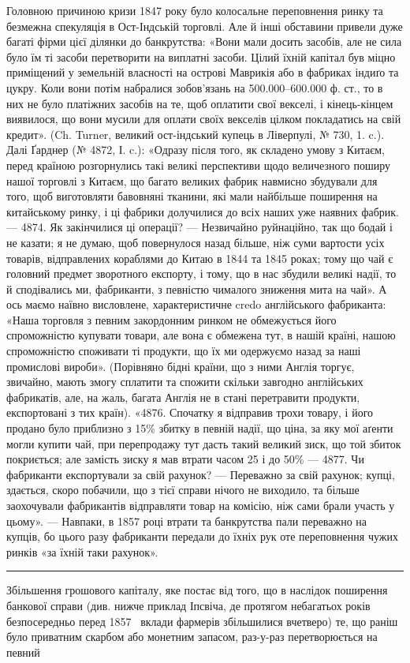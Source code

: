 Головною причиною кризи 1847 року було колосальне переповнення ринку
та безмежна спекуляція в Ост-Індській торговлі. Але й інші обставини привели
дуже багаті фірми цієї ділянки до банкрутства: «Вони мали досить засобів, але не
сила було їм ті засоби перетворити на виплатні засоби. Цілий їхній капітал був міцно
приміщений у земельній власності на острові Маврикія або в фабриках індиґо та
цукру. Коли вони потім набралися зобов’язань на \num{500.000}--\num{600.000} ф. ст., то
в них не було платіжних засобів на те, щоб оплатити свої векселі, і кінець-кінцем
виявилося, що вони мусили для оплати своїх векселів цілком покладатись
на свій кредит». (Ch. Turner, великий ост-індський купець в Ліверпулі, № 730,
1. c.). Далі Ґарднер (№ 4872, І. c.): «Одразу після того, як складено умову
з Китаєм, перед країною розгорнулись такі великі перспективи щодо величезного
поширу нашої торговлі з Китаєм, що багато великих фабрик навмисно збудували
для того, щоб виготовляти бавовняні тканини, які мали найбільше поширення на китайському
ринку, і ці фабрики долучилися до всіх наших уже наявних фабрик. —
4874. Як закінчилися ці операції? — Незвичайно руйнаційно, так що бодай і не казати;
я не думаю, щоб повернулося назад більше, ніж  суми вартости усіх товарів,
відправлених кораблями до Китаю в 1844 та 1845 роках; тому що чай є головний
предмет зворотного експорту, і тому, що в нас збудили великі надії, то й сподівались ми,
фабриканти, з певністю чималого зниження мита на чай». А ось маємо наївно висловлене,
характеристичне credo англійського фабриканта: «Наша торговля з певним
закордонним ринком не обмежується його спроможністю купувати товари, але вона
є обмежена тут, в нашій країні, нашою спроможністю споживати ті продукти,
що їх ми одержуємо назад за наші промислові вироби». (Порівняно бідні країни,
що з ними Англія торгує, звичайно, мають змогу сплатити та спожити скільки
завгодно англійських фабрикатів, але, на жаль, багата Англія не в стані перетравити
продукти, експортовані з тих країн). «4876. Спочатку я відправив трохи
товару, і його продано було приблизно з 15\% збитку в певній надії, що ціна, за
яку мої аґенти могли купити чай, при перепродажу тут дасть такий великий
зиск, що той збиток покриється; але замість зиску я мав втрати часом 25 і до
50\% — 4877. Чи фабриканти експортували за свій рахунок? — Переважно за свій
рахунок; купці, здається, скоро побачили, що з тієї справи нічого не виходило, та
більше заохочували фабрикантів відправляти товар на комісію, ніж сами брали
участь у цьому». — Навпаки, в 1857 році втрати та банкрутства пали переважно
на купців, бо цього разу фабриканти передали до їхніх рук оте переповнення чужих
ринків «за їхній таки рахунок».

\pfbreak

Збільшення грошового капіталу, яке постає від того, що в наслідок поширення
банкової справи (див. нижче приклад Іпсвіча, де протягом небагатьох років
безпосередньо перед 1857~ вклади фармерів збільшилися вчетверо) те, що раніш було
приватним скарбом або монетним запасом, раз-у-раз перетворюється на певний
\parbreak{}  %
